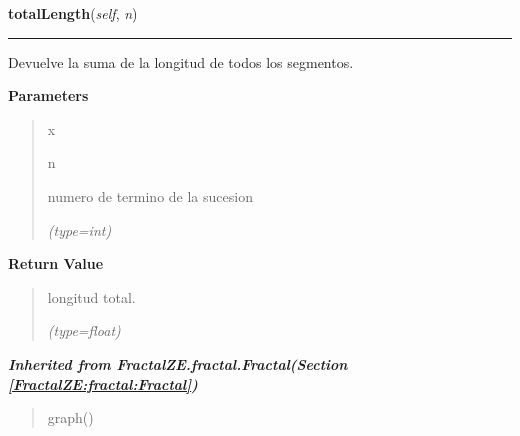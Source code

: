 \hspace{.8\funcindent}\begin{boxedminipage}{\funcwidth}

    \raggedright \textbf{totalLength}(\textit{self}, \textit{n})

    \vspace{-1.5ex}

    \rule{\textwidth}{0.5\fboxrule}
\setlength{\parskip}{2ex}
    Devuelve la suma de la longitud de todos los segmentos.

\setlength{\parskip}{1ex}
      \textbf{Parameters}
      \vspace{-1ex}

      \begin{quote}
        \begin{Ventry}{x}

          \item[n]

          numero de termino de la sucesion

            {\it (type=int)}

        \end{Ventry}

      \end{quote}

      \textbf{Return Value}
    \vspace{-1ex}

      \begin{quote}
      longitud total.

      {\it (type=float)}

      \end{quote}

    \end{boxedminipage}


\large{\textbf{\textit{Inherited from FractalZE.fractal.Fractal\textit{(Section \ref{FractalZE:fractal:Fractal})}}}}

\begin{quote}
graph()
\end{quote}

